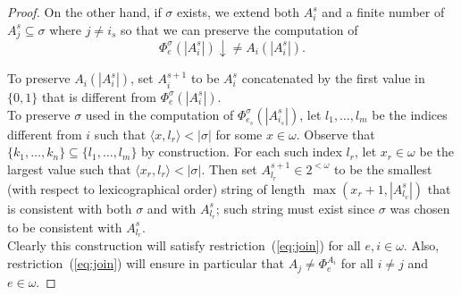 \documentclass{article}
\begin{document}
\begin{proof}
    On the other hand, if $\sigma$ exists, we extend both
    $A_{i}^s$ and a finite number of $A_{j}^s\subseteq \sigma$ where
    $j\neq i_s$ so that we can preserve the computation of
    \[\Phi_{e}^\sigma (|A_{i}^s|) \downarrow \neq
    A_{i}(|A_{i}^s|).\]

    To preserve $A_{i}(|A_{i}^s|)$, set $A_{i}^{s+1}$ to be
    $A_{i}^s$ concatenated by the first value in $\{0,1\}$ that is
    different from $\Phi_{e}^\sigma (|A_{i}^s|)$. \\

    To preserve $\sigma$ used in the computation of $\Phi_{e_s}^\sigma
    (|A_{i_s}^s|)$, let $l_1,\ldots,l_m$ be the indices different from $i$
    such that $\langle x,l_r\rangle <|\sigma|$ for some $x\in\omega$.
    Observe that $\{k_1,\ldots,k_n\}\subseteq \{l_1,\ldots,l_m\}$ by
    construction. For each such index $l_r$, let $x_r\in\omega$ be the
    largest value such that $\langle x_r,l_r\rangle <|\sigma|$. Then set
    $A_{l_r}^{s+1}\in 2^{<\omega}$ to be the smallest (with respect to
    lexicographical order) string of length $\max(x_r+1,|A_{l_v}^s|)$ that
    is consistent with both $\sigma$ and with $A_{l_r}^s$; such string must
    exist since $\sigma$ was chosen to be consistent with $A_{l_r}^s$. \\

    Clearly this construction will satisfy restriction~(\ref{eq:join})
    for all $e,i\in\omega$. Also, restriction~(\ref{eq:join}) will ensure
    in particular that $A_j\neq \Phi_e^{A_i}$ for all $i\neq j$ and
    $e\in\omega$. 




\end{proof}
\end{document}
